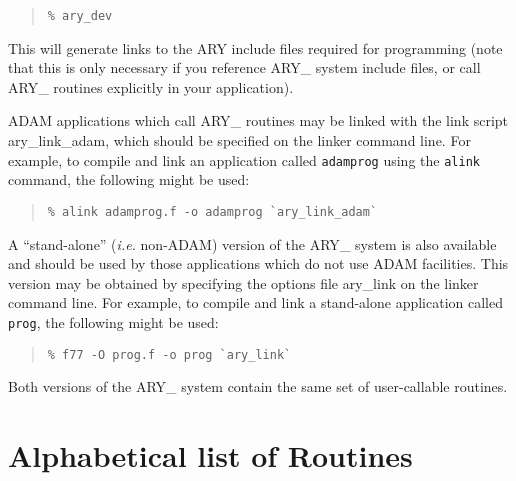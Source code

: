 \documentclass[twoside,11pt]{article}
\newcommand{\xlabel}[1]{}
\begin{document}
\begin{eqn*}
\begin{quote}\begin{verbatim}
% ary_dev
\end{verbatim}\end{quote}

This will generate links to the ARY include files required for 
programming (note that this is only necessary if you reference ARY\_
system include files, or call ARY\_ routines explicitly in your
application).

ADAM applications which call ARY\_ routines may be linked with the link
script \mbox{ary\_link\_adam}, which should be specified on the linker
command line.  For example, to compile and link an application called
\texttt{adamprog} using the \texttt{alink} command, the following might be
used:

\begin{quote}\begin{verbatim}
% alink adamprog.f -o adamprog `ary_link_adam`
\end{verbatim}\end{quote}

A ``stand-alone'' (\emph{i.e.} non-ADAM) version of the ARY\_ system is
also available and should be used by those applications which do not
use ADAM facilities.  This version may be obtained by specifying the
options file \mbox{ary\_link} on the linker command line.  For example,
to compile and link a stand-alone application called \texttt{prog}, the
following might be used:

\begin{quote}\begin{verbatim}
% f77 -O prog.f -o prog `ary_link`
\end{verbatim}\end{quote}

Both versions of the ARY\_ system contain the same set of user-callable
routines.  

\newpage
\appendix

\section{\xlabel{alphabetical_list_of_routines}Alphabetical list of Routines}
\label{alphabetical_list_of_routines}


\end{eqn*}
\end{document}

